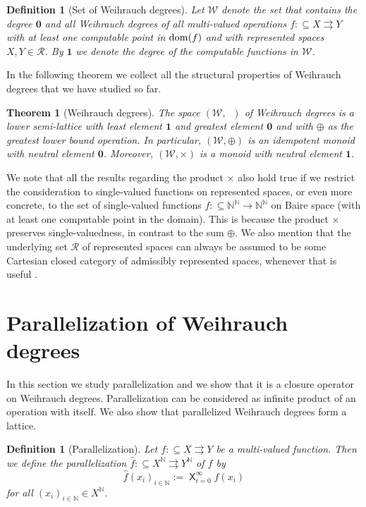 \documentclass[jsl,10pt]{noasl}
\def\RR{{\mathcal R}}
\def\WW{{\mathcal W}}
\def\IN{{\mathbb{N}}}
\def\In{\subseteq}
\def\mto{\rightrightarrows}
\def\dom{{\rm dom}}
\def\leqW{\mathop{\leq_{\mathrm{W}}}}
\def\bigtimes{\mathop{\mathsf{X}}}
\def\topW{\mathbf{0}}
\def\botW{\mathbf{1}}
\newtheorem{theorem}[proposition]{Theorem}
\newtheorem{definition}[proposition]{Definition}
\begin{document}
\begin{definition}[Set of Weihrauch degrees]\rm
Let $\WW$ denote the set that contains the degree $\topW$ and all Weihrauch degrees 
of all multi-valued operations $f:\In X\mto Y$ with at least one computable point in $\dom(f)$
and with represented spaces $X,Y\in\RR$.
By $\botW$ we denote the degree of the computable functions in $\WW$.
\end{definition}

In the following theorem we collect all the structural properties of Weih\-rauch degrees that we have
studied so far.

\begin{theorem}[Weihrauch degrees]
\label{thm:Weihrauch}
The space $(\WW,\leqW)$ of Weihrauch degrees is a lower semi-lattice with least element $\botW$
and greatest element $\topW$ and with $\oplus$ as the greatest lower bound operation.
In particular, $(\WW,\oplus)$ is an idempotent monoid with neutral element $\topW$.
Moreover, $(\WW,\times)$ is a monoid with neutral element $\botW$.
\end{theorem}

We note that all the results regarding the product $\times$ also hold true if we
restrict the consideration to single-valued functions on represented spaces,
or even more concrete, to the set of single-valued functions $f:\In\IN^\IN\to\IN^\IN$
on Baire space (with at least one computable point in the domain). 
This is because the product $\times$ preserves single-valuedness, in 
contrast to the sum $\oplus$.
We also mention that the underlying set $\RR$ of represented spaces can always be assumed to be
some Cartesian closed category of admissibly represented spaces, 
whenever that is useful \cite{Sch02}.


\section{Parallelization of Weihrauch degrees}
\label{sec:parallelization}

In this section we study parallelization and we show that it is
a closure operator on Weihrauch degrees.
Parallelization can be considered as infinite product of an operation
with itself. We also show that parallelized Weihrauch degrees form a
lattice.

\begin{definition}[Parallelization]\rm
Let $f:\In X\mto Y$ be a multi-valued function. Then we define
the {\em parallelization} $\widehat{f}:\In X^\IN\mto Y^\IN$ of $f$ by 
\[\widehat{f}(x_i)_{i\in\IN}:=\bigtimes_{i=0}^\infty f(x_i)\]
for all $(x_i)_{i\in\IN}\in X^\IN$.
\end{definition}
\end{document}
